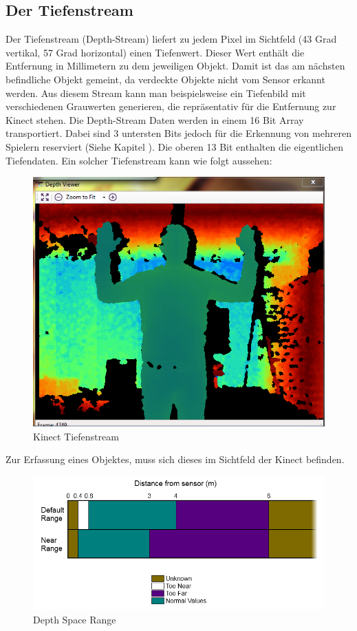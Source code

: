 \subsection{Der Tiefenstream}
Der Tiefenstream (Depth-Stream) liefert zu jedem Pixel im Sichtfeld (43 Grad vertikal, 57 Grad horizontal) einen Tiefenwert. Dieser Wert enthält die Entfernung in Millimetern zu dem jeweiligen Objekt.
Damit ist das am nächsten befindliche Objekt gemeint, da verdeckte Objekte nicht vom Sensor erkannt werden.
Aus diesem Stream kann man beispielsweise ein Tiefenbild mit verschiedenen Grauwerten generieren, die repräsentativ für die Entfernung zur Kinect stehen. Die Depth-Stream Daten werden in einem 16 Bit Array transportiert. Dabei sind 3 untersten Bits jedoch für die Erkennung von mehreren Spielern reserviert
(Siehe Kapitel ). Die oberen 13 Bit enthalten die eigentlichen Tiefendaten. Ein solcher Tiefenstream kann wie folgt aussehen:

\begin{figure}[H]						
	\centering							
	\includegraphics[scale=0.5]{Bilder/kinect_tiefenstream.png}			
	\caption{Kinect Tiefenstream}						
	\label{f:kinect_depth_stream}						
\end{figure}

Zur Erfassung eines Objektes, muss sich dieses im Sichtfeld der Kinect befinden. 
\begin{figure}[H]						
	\centering							
	\includegraphics[scale=0.7]{Bilder/kinect_range.png}			
	\caption{Depth Space Range \cite{ws:microsoft_coordinateSpaces}}						
	\label{f:kinect_range}						
\end{figure}

